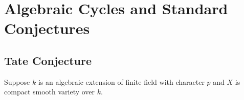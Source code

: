 \chapter{Algebraic Cycles and Standard Conjectures}
\section{Tate Conjecture}
Suppose $k$ is an algebraic extension of finite field with character $p$ and $X$ is compact smooth variety over $k$.